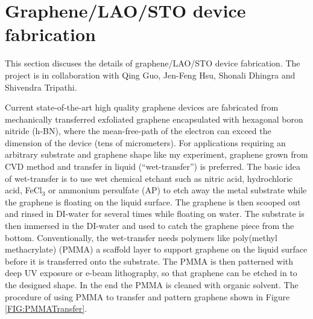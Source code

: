 \documentclass[pdflatex, sectionletters, 12pt]{pittetd}    %
\begin{document}


\section{Graphene/LAO/STO device fabrication}

This section discuses the details of graphene/LAO/STO device fabrication. The project is in collaboration with Qing Guo, Jen-Feng Hsu, Shonali Dhingra and Shivendra Tripathi.

Current state-of-the-art high quality graphene devices are fabricated from mechanically transferred exfoliated graphene encapsulated with hexagonal boron nitride (h-BN)\cite{dean2010naturenano}, where the mean-free-path of the electron can exceed the dimension of the device\cite{Novoselovaac9439} (tens of micrometers). For applications requiring an arbitrary substrate and graphene shape like my experiment, graphene grown from CVD method and transfer in liquid (``wet-transfer'') is preferred. The basic idea of wet-transfer is to use wet chemical etchant such as nitric acid, hydrochloric acid, FeCl$_3$ or ammonium persulfate (AP) to etch away the metal substrate while the graphene is floating on the liquid surface. The graphene is then scooped out and rinsed in DI-water for several times while floating on water. The substrate is then immersed in the DI-water and used to catch the graphene piece from the bottom. Conventionally, the wet-transfer needs polymers like poly(methyl methacrylate) (PMMA) a scaffold layer to support  graphene on the liquid surface before it is transferred onto the substrate\cite{li2009transfer, reina2008transferring, reina2008large}. The PMMA is then patterned with deep UV exposure or e-beam lithography, so that graphene can be etched in to the designed shape. In the end the PMMA is cleaned with organic solvent. The procedure of using PMMA to transfer and pattern graphene shown in Figure \ref{FIG:PMMATransfer}. 
\end{document}
